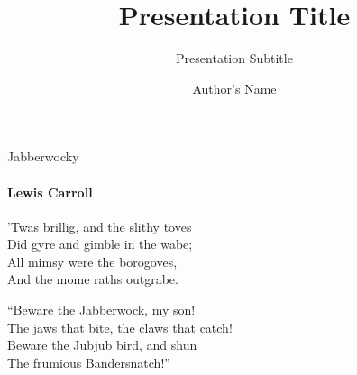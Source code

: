\documentclass{beamer}
\title{Presentation Title}
\subtitle{Presentation Subtitle}
\author{Author's Name}
\begin{document}
  \frame{\maketitle}
  \begin{frame}{Jabberwocky}
    \framesubtitle{Lewis Carroll}%
    'Twas brillig, and the slithy toves\\
    Did gyre and gimble in the wabe;\\
    All mimsy were the borogoves,\\
    And the mome raths outgrabe.\\\bigskip

    “Beware the Jabberwock, my son!\\
    The jaws that bite, the claws that catch!\\
    Beware the Jubjub bird, and shun\\
    The frumious Bandersnatch!”\\
  \end{frame}
  
\end{document}
